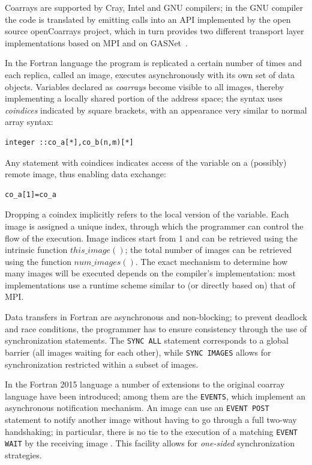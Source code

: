 \documentclass{IOS-Book-Article}
\begin{document}
Coarrays are supported by Cray, Intel and  GNU 
compilers; in the GNU compiler the code is translated by emitting
calls into an API  implemented by the open source openCoarrays
project, which in turn provides two different transport
layer implementations  based on MPI and on GASNet~\cite{PGAS14}.  

In the Fortran language the program is replicated a certain number of
times and each replica, called an image, executes asynchronously
with its own set of data objects.  
 Variables  declared as \emph{coarrays} become visible to all images,
 thereby implementing a locally shared portion of the address space;
 the syntax uses \emph{coindices} indicated by square brackets, with
 an appearance very similar to normal array syntax:
{\small
\begin{lstlisting}
integer ::co_a[*],co_b(n,m)[*]
\end{lstlisting}}
Any statement with coindices indicates access of the variable on a
(possibly) remote image, thus enabling data exchange:
{\small
\begin{lstlisting}
co_a[1]=co_a
\end{lstlisting}}
Dropping a coindex implicitly refers to the local version of the
variable. 
Each image is assigned a unique index, through which the programmer
can control the flow of the execution. Image indices start from 1 and
can be retrieved using the intrinsic function $this\_image()$;  the
total number of images can be retrieved using the function
$num\_images()$. %
The exact mechanism to determine how many images will be executed
depends on the compiler's implementation: most implementations use a
runtime scheme similar to (or directly based on) that of MPI. 

Data transfers in Fortran are asynchronous and non-blocking;
to prevent  deadlock and race conditions, the programmer has to ensure
consistency through the use of synchronization statements.
%
The \verb|SYNC ALL| statement corresponds to a global barrier (all
images waiting for each other), while \verb|SYNC IMAGES| allows for
 synchronization restricted within a subset of images.

In the Fortran 2015 language a number of extensions to the original
coarray language have been introduced; among them are the
\verb|EVENTS|, which implement an asynchronous notification
mechanism. 
An image can use an \verb|EVENT POST| statement to notify another
image without having to go through a full two-way handshaking; in
particular, there is no tie to the 
execution of a matching \verb|EVENT WAIT| by the receiving image .
This facility allows for \emph{one-sided} synchronization
strategies.   
\end{document}
